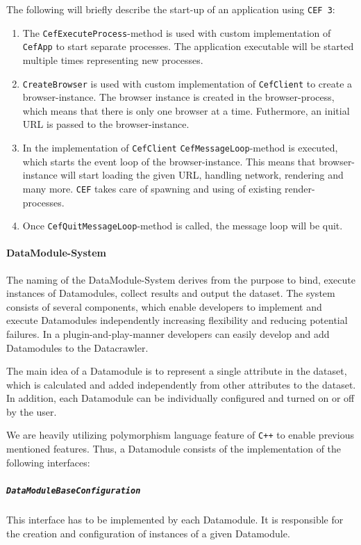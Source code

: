 The following will briefly describe the start-up of an application using \texttt{CEF 3}:
\begin{enumerate}
	\item The \texttt{CefExecuteProcess}-method is used with custom implementation of \texttt{CefApp} to start separate processes. The application executable will be started multiple times representing new processes.
	\item \texttt{CreateBrowser} is used with custom implementation of \texttt{CefClient} to create a browser-instance. The browser instance is created in the browser-process, which means that there is only one browser at a time. Futhermore, an initial URL is passed to the browser-instance.
	\item In the implementation of \texttt{CefClient} \texttt{CefMessageLoop}-method is executed, which starts the event loop of the browser-instance. This means that browser-instance will start loading the given URL, handling network, rendering and many more. \texttt{CEF} takes care of spawning and using of existing render-processes.
	\item Once \texttt{CefQuitMessageLoop}-method is called, the message loop will be quit.
\end{enumerate}

\paragraph*{DataModule-System}
\label{datacrawler_datamodulesystem}
The naming of the DataModule-System derives from the purpose to bind, execute instances of Datamodules, collect results and output the dataset. The system consists of several components, which enable developers to implement and execute Datamodules independently increasing flexibility and reducing potential failures. In a plugin-and-play-manner developers can easily develop and add Datamodules to the Datacrawler.

The main idea of a Datamodule is to represent a single attribute in the dataset, which is calculated and added independently from other attributes to the dataset. In addition, each Datamodule can be individually configured and turned on or off by the user.

We are heavily utilizing polymorphism language feature of \texttt{C++} to enable previous mentioned features. Thus, a Datamodule consists of the implementation of the following interfaces:

\subparagraph*{\texttt{DataModuleBaseConfiguration}}
	This interface has to be implemented by each Datamodule. It is responsible for the creation and configuration of instances of a given Datamodule.



